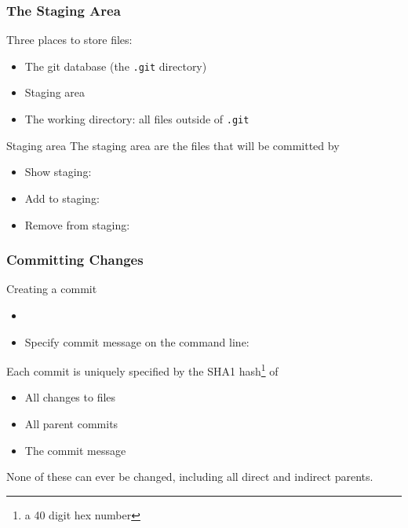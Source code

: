 \begin{frame}
  \frametitle{The Staging Area}

  Three places to store files:
  \begin{itemize}
  \item The git database (the \texttt{.git} directory)
  \item Staging area
  \item The working directory: all files outside of \texttt{.git} 
  \end{itemize}

  \begin{block}{Staging area}
    The staging area are the files that will be committed by
    \begin{itemize}
    \item Show staging: 
    \item Add to staging: 
    \item Remove from staging: 
    \end{itemize}
  \end{block}
\end{frame}




\begin{frame}
  \frametitle{Committing Changes}

  \begin{block}{Creating a commit}
    \begin{itemize}
    \item 
    \item Specify commit message on the command line:\\
    \end{itemize}
  \end{block}
  
  Each commit is uniquely specified by the SHA1 hash\footnote{a 40
    digit hex number} of
  \begin{itemize}
  \item All changes to files
  \item All parent commits
  \item The commit message
  \end{itemize}
  None of these can ever be changed, including all direct and indirect
  parents.
\end{frame}


